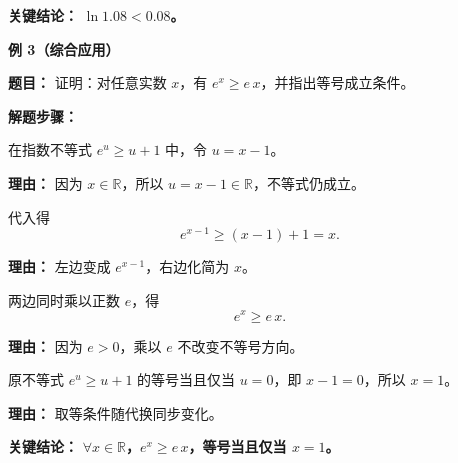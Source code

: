 \begin{examplebox}
	\textbf{\textcolor{CExample}{关键结论：}} \textbf{$\ln 1.08<0.08$。}

	\medskip
	\textbf{\textcolor{CExample}{例 3（综合应用）}}

	\textbf{\textcolor{CExample}{题目：}} 证明：对任意实数 $x$，有 $e^x\ge e\,x$，并指出等号成立条件。

	\textbf{\textcolor{CExample}{解题步骤：}}
	\begin{description}[style=nextline, leftmargin=2.8em, labelsep=0.5em, itemsep=0.45em]
		\item[\textbf{第一步（变量代换）：}]
		      在指数不等式 $e^u\ge u+1$ 中，令 $u=x-1$。
		      \par\textbf{理由：} 因为 $x\in\mathbb{R}$，所以 $u=x-1\in\mathbb{R}$，不等式仍成立。
		\item[\textbf{第二步（得到新不等式）：}]
		      代入得
		      \[
			      e^{x-1}\ge (x-1)+1=x.
		      \]
		      \par\textbf{理由：} 左边变成 $e^{x-1}$，右边化简为 $x$。
		\item[\textbf{第三步（变形为目标形式）：}]
		      两边同时乘以正数 $e$，得
		      \[
			      e^x\ge e\,x.
		      \]
		      \par\textbf{理由：} 因为 $e>0$，乘以 $e$ 不改变不等号方向。
		\item[\textbf{第四步（确定取等条件）：}]
		      原不等式 $e^u\ge u+1$ 的等号当且仅当 $u=0$，即 $x-1=0$，所以 $x=1$。
		      \par\textbf{理由：} 取等条件随代换同步变化。
	\end{description}

	\textbf{\textcolor{CExample}{关键结论：}} \textbf{$\forall x\in\mathbb{R}$，$e^x\ge e\,x$，等号当且仅当 $x=1$。}
\end{examplebox}